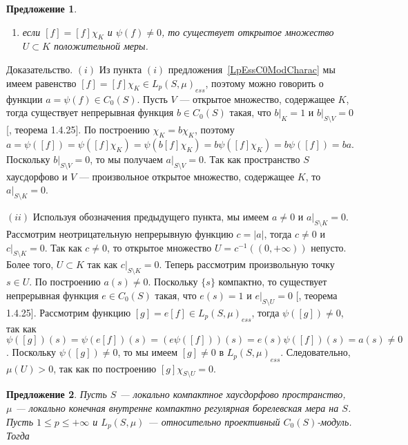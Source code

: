 \documentclass[12pt]{article}
\numberwithin{equation}{subsection}
\theoremstyle{plain}
\newtheorem{proposition}{Предложение}
\newenvironment{proof}{Доказательство.}{}
\begin{document}
\begin{fulltext}
\begin{proposition}
\begin{enumerate}[label = (\roman*)]
            \item если $[f]=[f]\chi_K$ и $\psi(f)\neq 0$, то существует открытое
                  множество $U\subset K$ положительной меры.
        \end{enumerate}
    \end{proposition}
    \begin{proof} $(i)$ Из пункта $(i)$ предложения~\ref{LpEssC0ModCharac} мы
        имеем равенство $[f]=[f]\chi_K\in {L_p(S,\mu)}_{ess}$, поэтому можно
        говорить о функции $a=\psi(f)\in C_0(S)$. Пусть $V$ --- открытое
        множество, содержащее $K$, тогда существует непрерывная функция $b\in
            C_0(S)$ такая, что $b|_K=1$ и $b|_{S\setminus V}=0$
        [\cite{DalesBanSpContFunDualSp}, теорема 1.4.25]. По построению
        $\chi_K=b\chi_K$, поэтому
        $a=\psi([f])=\psi([f]\chi_K)=\psi(b[f]\chi_K)
            =b\psi([f]\chi_K)=b\psi([f])=ba$.
        Поскольку $b|_{S\setminus V}=0$, то мы получаем $a|_{S\setminus V}=0$.
        Так как пространство $S$ хаусдорфово и $V$ --- произвольное открытое
        множество, содержащее $K$, то $a|_{S\setminus K}=0$.

        $(ii)$ Используя обозначения предыдущего пункта, мы имеем $a\neq 0$ и
        $a|_{S\setminus K}=0$. Рассмотрим неотрицательную непрерывную функцию
        $c=|a|$, тогда $c\neq 0$ и $c|_{S\setminus K}=0$. Так как $c\neq 0$, то
        открытое множество $U=c^{-1}((0, +\infty))$ непусто. Более того,
        $U\subset K$ так как $c|_{S\setminus K}=0$. Теперь рассмотрим
        произвольную точку $s\in U$. По построению $a(s)\neq 0$. Поскольку
        $\{s\}$ компактно, то существует непрерывная функция $e\in C_0(S)$
        такая, что $e(s)=1$ и $e|_{S\setminus U}=0$
        [\cite{DalesBanSpContFunDualSp}, теорема 1.4.25]. Рассмотрим функцию
        $[g]=e[f]\in {L_p(S,\mu)}_{ess}$, тогда $\psi([g])\neq 0$, так как
        $\psi([g])(s)=\psi(e[f])(s)=(e\psi([f]))(s)=e(s)\psi([f])(s)=a(s)\neq
            0$. Поскольку $\psi([g])\neq 0$, то мы имеем $[g]\neq 0$ в
        ${L_p(S,\mu)}_{ess}$. Следовательно, $\mu(U)>0$, так как по построению
        $[g]\chi_{S\setminus U}=0$.
    \end{proof}


    \begin{proposition}\label{LpC0ModNecessCond}  Пусть $S$ --- локально
        компактное хаусдорфово пространст\-во, $\mu$ --- локально конечная
        внутренне компактно регулярная борелевская мера на $S$. Пусть $1\leq
            p\leq +\infty$ и $L_p(S,\mu)$ --- относительно проективный
        $C_0(S)$-модуль. Тогда


\end{proposition}
\end{fulltext}
\end{document}
